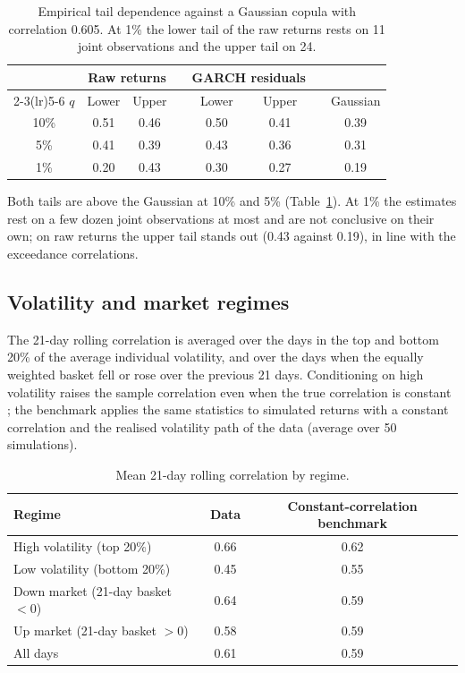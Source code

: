 \documentclass[11pt,a4paper]{article}
\begin{document}
\begin{table}[h]
\centering
\begin{tabular}{@{}c ccc ccc c@{}}
\toprule
 & \multicolumn{2}{c}{Raw returns} & & \multicolumn{2}{c}{GARCH residuals} & & \\
\cmidrule(lr){2-3}\cmidrule(lr){5-6}
$q$ & Lower & Upper & & Lower & Upper & & Gaussian \\
\midrule
10\% & 0.51 & 0.46 & & 0.50 & 0.41 & & 0.39 \\
5\%  & 0.41 & 0.39 & & 0.43 & 0.36 & & 0.31 \\
1\%  & 0.20 & 0.43 & & 0.30 & 0.27 & & 0.19 \\
\bottomrule
\end{tabular}
\caption{Empirical tail dependence against a Gaussian copula with correlation 0.605. At 1\% the lower tail of the raw
returns rests on 11 joint observations and the upper tail on 24.}
\label{tab:tail}
\end{table}

Both tails are above the Gaussian at 10\% and 5\% (Table~\ref{tab:tail}). At 1\% the estimates rest on a few dozen
joint observations at most and are not conclusive on their own; on raw returns the upper tail stands out (0.43
against 0.19), in line with the exceedance correlations.

\subsection{Volatility and market regimes}
The 21-day rolling correlation is averaged over the days in the top and bottom 20\% of the average individual
volatility, and over the days when the equally weighted basket fell or rose over the previous 21 days. Conditioning
on high volatility raises the sample correlation even when the true correlation is constant \cite{forbesrigobon2002};
the benchmark applies the same statistics to simulated returns with a constant correlation and the realised
volatility path of the data (average over 50 simulations).

\begin{table}[h]
\centering
\begin{tabular}{@{}lcc@{}}
\toprule
Regime & Data & Constant-correlation benchmark \\
\midrule
High volatility (top 20\%)    & 0.66 & 0.62 \\
Low volatility (bottom 20\%)  & 0.45 & 0.55 \\
Down market (21-day basket $<0$) & 0.64 & 0.59 \\
Up market (21-day basket $>0$)   & 0.58 & 0.59 \\
All days                         & 0.61 & 0.59 \\
\bottomrule
\end{tabular}
\caption{Mean 21-day rolling correlation by regime.}
\label{tab:regimes}
\end{table}
\end{document}
